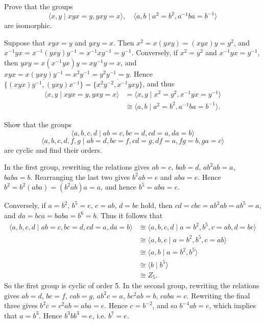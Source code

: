 \begin{questions}
\question Prove that the groups
  \[ \langle x,y \mid xyx = y, yxy = x \rangle, \quad \langle a,b \mid a^2=b^2, a^{-1}ba=b^{-1} \rangle \]
  are isomorphic.
  \begin{solution}
    Suppose that $xyx=y$ and $yxy=x$. Then $x^2=x(yxy)=(xyx)y=y^2$, and $x^{-1}yx=x^{-1}(yxy)y^{-1}=x^{-1}xy^{-1}=y^{-1}$. Conversely, if $x^2=y^2$ and $x^{-1}yx=y^{-1}$, then $yxy=x(x^{-1}yx)y=xy^{-1}y=x$, and $xyx=x(yxy)y^{-1}=x^2y^{-1}=y^2y^{-1}=y$. Hence $\overline{\{(xyx)y^{-1}, (yxy)x^{-1}\}}=\overline{\{x^2y^{-2}, x^{-1}yxy\}}$, and thus
    \begin{align*}
      \langle x,y \mid xyx=y, yxy=x \rangle &= \langle x,y \mid x^2=y^2, x^{-1}yx=y^{-1} \rangle \\
                                            &\cong \langle a,b \mid a^2=b^2, a^{-1}ba=b^{-1} \rangle.
    \end{align*}
  \end{solution}

\question Show that the groups
  \[ \langle a,b,c,d \mid ab=c, bc=d, cd=a, da=b \rangle \]
  \[ \langle a,b,c,d,f,g \mid ab=d, bc=f, cd=g, df=a, fg=b, ga=c \rangle \]
  are cyclic and find their orders.
  \begin{solution}
    In the first group, rewriting the relations gives $ab=c$, $bab=d$, $ab^2ab=a$, $baba=b$. Rearranging the last two gives $b^2ab=e$ and $aba=e$. Hence $b^2=b^2(aba)=(b^2ab)a=a$, and hence $b^5=aba=e$.

    Conversely, if $a=b^2$, $b^5=e$, $c=ab$, $d=bc$ hold, then $cd=cbc=ab^2ab=ab^5=a$, and $da=bca=baba=b^6=b$. Thus it follows that
    \begin{align*}
      \langle a,b,c,d \mid ab=c, bc=d, cd=a, da=b \rangle &\cong \langle a,b,c,d \mid a=b^2, b^5, c=ab, d=bc \rangle \\
                                                          &\cong \langle a,b,c \mid a=b^2, b^5, c=ab \rangle \\
                                                          &\cong \langle a,b \mid a=b^2, b^5 \rangle \\
                                                          &\cong \langle b \mid b^5 \rangle \\
                                                          &\cong Z_5.
    \end{align*}
    So the first group is cyclic of order 5. In the second group, rewriting the relations gives $ab=d$, $bc=f$, $cab=g$, $ab^2c=a$, $bc^2ab=b$, $caba=c$. Rewriting the final three gives $b^2c=c^2ab=aba=e$. Hence $c=b^{-2}$, and so $b^{-4}ab=e$, which implies that $a=b^3$. Hence $b^3bb^3=e$, i.e. $b^7=e$.


\end{solution}
\end{questions}
